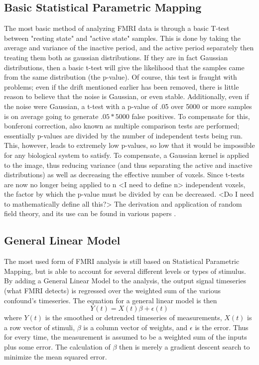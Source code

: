 \documentclass{article}
\begin{document}
\subsection*{Basic Statistical Parametric Mapping}
The most basic method of analyzing FMRI data is through a basic T-test
between "resting state" and "active state" samples. This is done by 
taking the average and variance of the inactive period, and the 
active period separately then treating them both as gaussian distributions.
If they are in fact Gaussian distributions, then a basic t-test will
give the likelihood that the samples came from the same distribution
(the p-value). Of course, this test is fraught with problems; even if
the drift mentioned earlier has been removed, there is little reason
to believe that the noise is Gaussian, or even stable. Additionally, 
even if the noise were Gaussian, a t-test with a p-value of .05 over
5000 or more samples is on average going to generate $.05*5000$ false
positives. To compensate for this, bonferoni correction, also known as
multiple comparison tests are performed; essentially p-values are 
divided by the number of independent
tests being run. This, however, leads to extremely low p-values, so
low that it would be impossible for any biological system to satisfy. To
compensate, a Gaussian kernel is applied to the image, thus reducing
variance (and thus separating the active and inactive distributions)
as well as decreasing the effective number of voxels. Since t-tests are
now no longer being applied to n <I need to define n> independent voxels,
the factor by which the p-value must be divided by can be decreased.
<Do I need to mathematically define all this?> The derivation and application
of random field theory, and its use can be found in various papers \cite{univ_mult_rft}.

\subsection*{General Linear Model}
The most used form of FMRI analysis is still based on Statistical Parametric
Mapping, but is able to account for several different levels or types
of stimulus. By adding a General Linear Model to the analysis, the
output signal timeseries (what FMRI detects) is regressed over the weighted
sum of the various confound's timeseries. The equation for a general linear
model is then
\begin{equation}
Y(t) = X(t)\beta + \epsilon(t)
\end{equation}
where $Y(t)$ is the smoothed or detrended timeseries of measurements,
$X(t)$ is a row vector of stimuli, $\beta$ is a column vector of weights,
and $\epsilon$ is the error. Thus for every time, the measurement is
assumed to be a weighted sum of the inputs plus some error. The calculation
of $\beta$ then is merely a gradient descent search to minimize the
mean squared error. 
\end{document}
